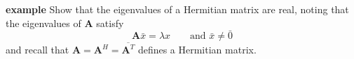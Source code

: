 \documentclass[12pt]{article}
\newcommand{\ve}[1]{\ensuremath{\mathbf{#1}}}
\begin{document}

\textbf{example}
Show that the eigenvalues of a Hermitian matrix are real, noting that the eigenvalues of $\ve{A}$ satisfy
\[\ve{A}\bar{x} = \lambda x \qquad \text{and } \bar{x} \neq \bar{0}\]
and recall that $\ve{A} = \ve{A}^H = \overline{\ve{A}^T}$ defines a Hermitian matrix. 


\end{document}
